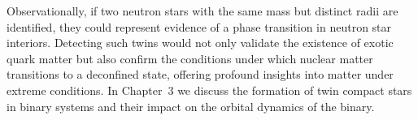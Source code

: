\documentclass[main.tex]{subfiles}
\begin{document}
    Observationally, if two neutron stars with the same mass but distinct radii are identified, they could represent evidence of a phase transition in neutron star interiors. Detecting such twins would not only validate the existence of exotic quark matter but also confirm the conditions under which nuclear matter transitions to a deconfined state, offering profound insights into matter under extreme conditions. In Chapter~3 we discuss the formation of twin compact stars in binary systems and their impact on the orbital dynamics of the binary.
    


\end{document}
